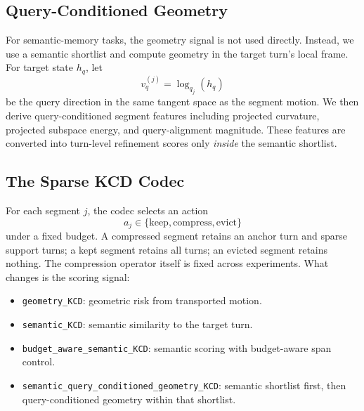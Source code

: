 \documentclass[11pt]{article}
\newcommand{\pname}[1]{\texttt{\small #1}}
\begin{document}
\subsection{Query-Conditioned Geometry}
For semantic-memory tasks, the geometry signal is not used directly. Instead, we use a semantic shortlist and compute geometry in the target turn's local frame. For target state $h_q$, let
\begin{equation}
v_q^{(j)} = \log_{q_j}(h_q)
\end{equation}
be the query direction in the same tangent space as the segment motion. We then derive query-conditioned segment features including projected curvature, projected subspace energy, and query-alignment magnitude. These features are converted into turn-level refinement scores only \emph{inside} the semantic shortlist.

\subsection{The Sparse KCD Codec}
For each segment $j$, the codec selects an action
\begin{equation}
a_j \in \{\mathrm{keep}, \mathrm{compress}, \mathrm{evict}\}
\end{equation}
under a fixed budget. A compressed segment retains an anchor turn and sparse support turns; a kept segment retains all turns; an evicted segment retains nothing. The compression operator itself is fixed across experiments. What changes is the scoring signal:
\begin{itemize}[leftmargin=1.25em]
    \item \pname{geometry\_KCD}: geometric risk from transported motion.
    \item \pname{semantic\_KCD}: semantic similarity to the target turn.
    \item \pname{budget\_aware\_semantic\_KCD}: semantic scoring with budget-aware span control.
    \item \pname{semantic\_query\_conditioned\_geometry\_KCD}: semantic shortlist first, then query-conditioned geometry within that shortlist.
\end{itemize}
\end{document}
